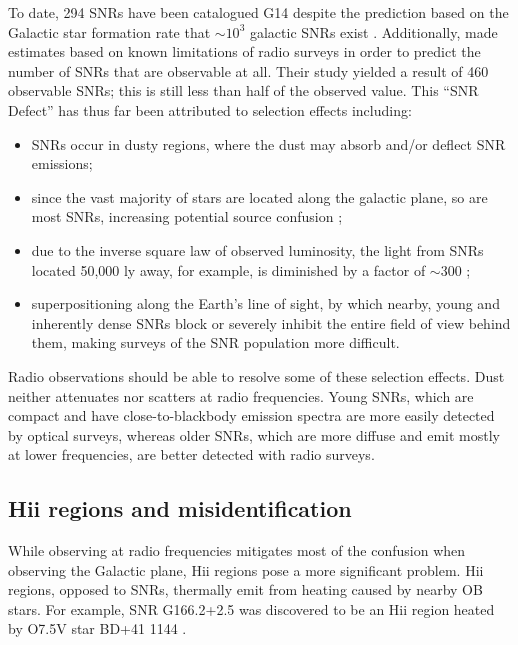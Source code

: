 \documentclass[useAMS,usenatbib]{mn2e}
\begin{document}
To date, 294 SNRs have been catalogued G14 despite the prediction based on the Galactic star formation rate that $\sim10^3$ galactic SNRs exist \citep{Li.91,Pavlovic.13}.  
Additionally, \cite{Brogan.06} made estimates based on known limitations of radio surveys in order to predict the number of SNRs that are observable at all.
Their study yielded a result of 460 observable SNRs; this is still less than half of the observed value. 
This “SNR Defect” has thus far been attributed to selection effects including: 
\begin{itemize}
\item SNRs occur in dusty regions, where the dust may absorb and/or deflect SNR emissions;
\item since the vast majority of stars are located along the galactic plane, so are most SNRs, increasing potential source confusion \citep[e.g.][]{Gao_v.11,Gao_vi.11};
\item due to the inverse square law of observed luminosity,%
the light from SNRs located 50,000 ly away, for example, is diminished by a factor of $\sim$300  \citep{Green.91};
\item superpositioning along the Earth’s line of sight, by which nearby, young  and inherently dense SNRs block or severely inhibit the entire field of view behind them, making surveys of the SNR population more difficult. 
\end{itemize}

Radio observations should be able to resolve some of these selection effects. Dust neither attenuates nor scatters at radio frequencies. Young SNRs, which are compact and have close-to-blackbody emission spectra are more easily detected by optical surveys, whereas older SNRs, which are more diffuse and emit mostly at lower frequencies, are better detected with radio surveys.

\subsection{H{\sc ii} regions and misidentification}
While observing at radio frequencies mitigates most of the confusion when observing the Galactic plane, H{\sc ii} regions pose a more significant problem.  H{\sc ii} regions, opposed to SNRs, thermally emit from heating caused by nearby OB stars.
For example, SNR G166.2+2.5 was discovered to be an H{\sc ii} region heated by O7.5V star BD+41 1144 \citep{Foster.06}.  
\end{document}
